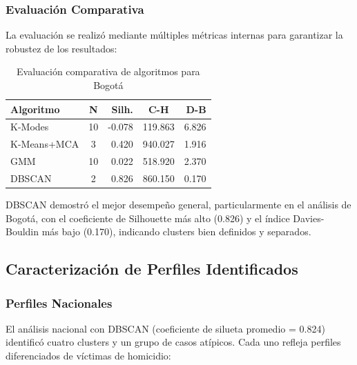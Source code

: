 \documentclass[lettersize,journal]{IEEEtran}
\begin{document}
\subsubsection{Evaluación Comparativa}
La evaluación se realizó mediante múltiples métricas internas para garantizar la robustez de los resultados:

\begin{table}[t]
\centering
\caption{Evaluación comparativa de algoritmos para Bogotá}
\label{tab:evaluacion_algoritmos}
\small
\begin{tabular}{@{}lcrcr@{}}
\toprule
\textbf{Algoritmo} & \textbf{N} & \textbf{Silh.} & \textbf{C-H} & \textbf{D-B} \\ 
\midrule
K-Modes           & 10  & -0.078  & 119.863  & 6.826  \\
K-Means+MCA       & 3   & 0.420   & 940.027  & 1.916  \\
GMM               & 10  & 0.022   & 518.920  & 2.370  \\
DBSCAN            & 2   & 0.826   & 860.150  & 0.170  \\
\bottomrule
\end{tabular}
\end{table}
DBSCAN demostró el mejor desempeño general, particularmente en el análisis de Bogotá, con el coeficiente de Silhouette más alto (0.826) y el índice Davies-Bouldin más bajo (0.170), indicando clusters bien definidos y separados.
\subsection{Caracterización de Perfiles Identificados}

\subsubsection{Perfiles Nacionales}

El análisis nacional con DBSCAN (coeficiente de silueta promedio = 0.824) identificó cuatro clusters y un grupo de casos atípicos. Cada uno refleja perfiles diferenciados de víctimas de homicidio:
\end{document}

